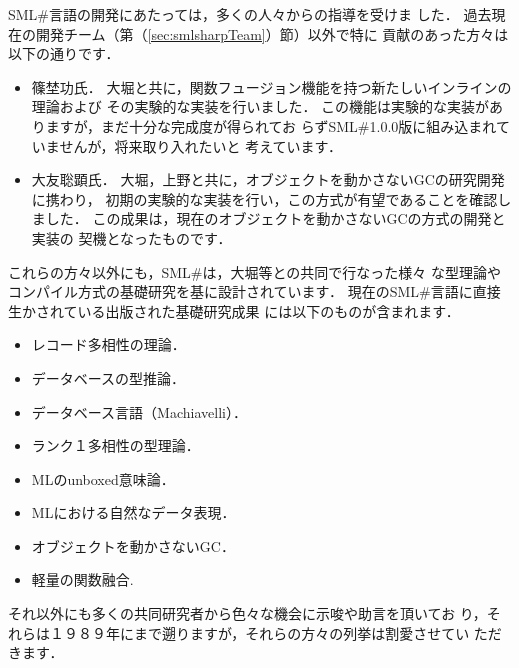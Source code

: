 \documentclass{jbook}
\newcommand{\smlsharp}{SML\#}
\newcommand{\version}{1.0.0}
\begin{document}
\ifx\jp%
	\smlsharp{}言語の開発にあたっては，多くの人々からの指導を受けま
した．
	過去現在の開発チーム（第（\ref{sec:smlsharpTeam}）節）以外で特に
貢献のあった方々は以下の通りです．
\begin{itemize}
\item 篠埜功氏．
大堀と共に，関数フュージョン機能を持つ新たしいインラインの理論および
その実験的な実装を行いました．
	この機能は実験的な実装がありますが，まだ十分な完成度が得られてお
らず\smlsharp{}\version{}版に組み込まれていませんが，将来取り入れたいと
考えています．
\item 大友聡顕氏．
	大堀，上野と共に，オブジェクトを動かさないGCの研究開発に携わり，
初期の実験的な実装を行い，この方式が有望であることを確認しました．
	この成果は，現在のオブジェクトを動かさないGCの方式の開発と実装の
契機となったものです．
\end{itemize}
	これらの方々以外にも，\smlsharp{}は，大堀等との共同で行なった様々
な型理論やコンパイル方式の基礎研究を基に設計されています．
	現在の\smlsharp{}言語に直接生かされている出版された基礎研究成果
には以下のものが含まれます．
\begin{itemize}
\item レコード多相性の理論\cite{ohor92popl,ohor95toplas}．
\item データベースの型推論\cite{ohor88lfp}．
\item データベース言語（Machiavelli）\cite{ohor89sigmod,bune96tods}．
\item ランク１多相性の型理論\cite{ohor99icfp}．
\item MLのunboxed意味論\cite{ohor97unbox}．
\item MLにおける自然なデータ表現\cite{nguyen06ppdp}．
\item オブジェクトを動かさないGC\cite{ueno11icfp}．
\item 軽量の関数融合\cite{ohor07popl}.
\end{itemize}
	それ以外にも多くの共同研究者から色々な機会に示唆や助言を頂いてお
り，それらは１９８９年にまで遡りますが，それらの方々の列挙は割愛させてい
ただきます．
\else%
\end{document}
